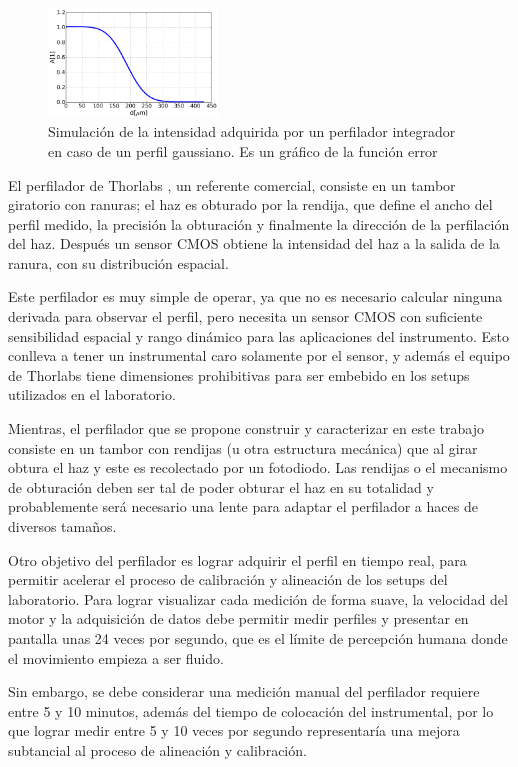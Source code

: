 \begin{figure}[H]
\centering
\includegraphics[width=0.4\textwidth]{fig/perfilador/err_function}
\caption{Simulación de la intensidad adquirida por un perfilador integrador en caso de un perfil gaussiano. Es un gráfico de la función error}
\label{fig:perfilador/err_function}
\end{figure}

El perfilador de Thorlabs \cite{thorlabs_profiler}, un referente comercial, consiste en un tambor giratorio con ranuras; el haz es obturado por la rendija, que define el ancho del perfil medido, la precisión la obturación y finalmente la dirección de la perfilación del haz. Después un sensor CMOS obtiene la intensidad del haz a la salida de la ranura, con su distribución espacial. 

Este perfilador es muy simple de operar, ya que no es necesario calcular ninguna derivada para observar el perfil, pero necesita un sensor CMOS con suficiente sensibilidad espacial y rango dinámico para las aplicaciones del instrumento. Esto conlleva a tener un instrumental caro solamente por el sensor, y además el equipo de Thorlabs tiene dimensiones prohibitivas para ser embebido en los setups utilizados en el laboratorio.

Mientras, el perfilador que se propone construir y caracterizar en este trabajo consiste en un tambor con rendijas (u otra estructura mecánica) que al girar obtura el haz y este es recolectado por un fotodiodo. Las rendijas o el mecanismo de obturación deben ser tal de poder obturar el haz en su totalidad y probablemente será necesario una lente para adaptar el perfilador a haces de diversos tamaños.

Otro objetivo del perfilador es lograr adquirir el perfil en tiempo real, para permitir acelerar el proceso de calibración y alineación de los setups del laboratorio. Para lograr visualizar cada medición de forma suave, la velocidad del motor y la adquisición de datos debe permitir medir perfiles y presentar en pantalla unas 24 veces por segundo, que es el límite de percepción humana donde el movimiento empieza a ser fluido.

Sin embargo, se debe considerar una medición manual del perfilador requiere entre 5 y 10 minutos, además del tiempo de colocación del instrumental, por lo que lograr medir entre 5 y 10 veces por segundo representaría una mejora subtancial al proceso de alineación y calibración.

